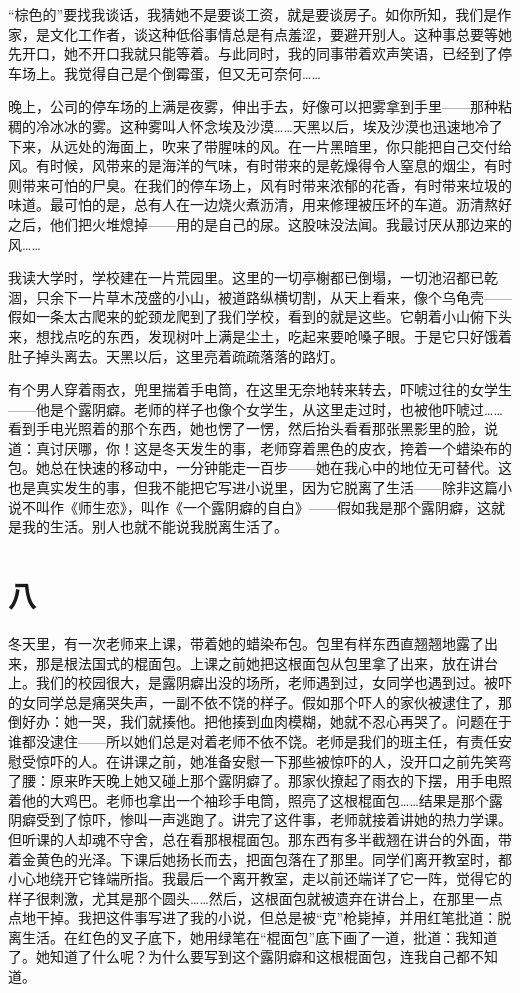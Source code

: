 “棕色的”要找我谈话，我猜她不是要谈工资，就是要谈房子。如你所知，我们是作家，是文化工作者，谈这种低俗事情总是有点羞涩，要避开别人。这种事总要等她先开口，她不开口我就只能等着。与此同时，我的同事带着欢声笑语，已经到了停车场上。我觉得自己是个倒霉蛋，但又无可奈何…… 

晚上，公司的停车场的上满是夜雾，伸出手去，好像可以把雾拿到手里——那种粘稠的冷冰冰的雾。这种雾叫人怀念埃及沙漠……天黑以后，埃及沙漠也迅速地冷了下来，从远处的海面上，吹来了带腥味的风。在一片黑暗里，你只能把自己交付给风。有时候，风带来的是海洋的气味，有时带来的是乾燥得令人窒息的烟尘，有时则带来可怕的尸臭。在我们的停车场上，风有时带来浓郁的花香，有时带来垃圾的味道。最可怕的是，总有人在一边烧火煮沥清，用来修理被压坏的车道。沥清熬好之后，他们把火堆熄掉——用的是自己的尿。这股味没法闻。我最讨厌从那边来的风…… 

我读大学时，学校建在一片荒园里。这里的一切亭榭都已倒塌，一切池沼都已乾涸，只余下一片草木茂盛的小山，被道路纵横切割，从天上看来，像个乌龟壳——假如一条太古爬来的蛇颈龙爬到了我们学校，看到的就是这些。它朝着小山俯下头来，想找点吃的东西，发现树叶上满是尘土，吃起来要呛嗓子眼。于是它只好饿着肚子掉头离去。天黑以后，这里亮着疏疏落落的路灯。 

有个男人穿着雨衣，兜里揣着手电筒，在这里无奈地转来转去，吓唬过往的女学生——他是个露阴癖。老师的样子也像个女学生，从这里走过时，也被他吓唬过……看到手电光照着的那个东西，她也愣了一愣，然后抬头看看那张黑影里的脸，说道：真讨厌哪，你！这是冬天发生的事，老师穿着黑色的皮衣，挎着一个蜡染布的包。她总在快速的移动中，一分钟能走一百步——她在我心中的地位无可替代。这也是真实发生的事，但我不能把它写进小说里，因为它脱离了生活——除非这篇小说不叫作《师生恋》，叫作《一个露阴癖的自白》——假如我是那个露阴癖，这就是我的生活。别人也就不能说我脱离生活了。 
\section*{八} 

冬天里，有一次老师来上课，带着她的蜡染布包。包里有样东西直翘翘地露了出来，那是根法国式的棍面包。上课之前她把这根面包从包里拿了出来，放在讲台上。我们的校园很大，是露阴癖出没的场所，老师遇到过，女同学也遇到过。被吓的女同学总是痛哭失声，一副不依不饶的样子。假如那个吓人的家伙被逮住了，那倒好办：她一哭，我们就揍他。把他揍到血肉模糊，她就不忍心再哭了。问题在于谁都没逮住——所以她们总是对着老师不依不饶。老师是我们的班主任，有责任安慰受惊吓的人。在讲课之前，她准备安慰一下那些被惊吓的人，没开口之前先笑弯了腰：原来昨天晚上她又碰上那个露阴癖了。那家伙撩起了雨衣的下摆，用手电照着他的大鸡巴。老师也拿出一个袖珍手电筒，照亮了这根棍面包……结果是那个露阴癖受到了惊吓，惨叫一声逃跑了。讲完了这件事，老师就接着讲她的热力学课。但听课的人却魂不守舍，总在看那根棍面包。那东西有多半截翘在讲台的外面，带着金黄色的光泽。下课后她扬长而去，把面包落在了那里。同学们离开教室时，都小心地绕开它锋端所指。我最后一个离开教室，走以前还端详了它一阵，觉得它的样子很刺激，尤其是那个圆头……然后，这根面包就被遗弃在讲台上，在那里一点点地干掉。我把这件事写进了我的小说，但总是被“克”枪毙掉，并用红笔批道：脱离生活。在红色的叉子底下，她用绿笔在“棍面包”底下画了一道，批道：我知道了。她知道了什么呢？为什么要写到这个露阴癖和这根棍面包，连我自己都不知道。 

